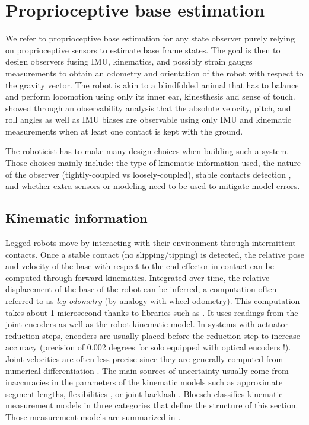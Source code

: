 \section{Proprioceptive base estimation}

We refer to proprioceptive base estimation for any state observer purely relying on proprioceptive sensors to estimate base frame states. 
The goal is then to design observers fusing IMU, kinematics, and possibly strain gauges measurements to obtain an odometry and orientation of 
the robot with respect to the gravity vector. The robot is akin to a blindfolded animal that has to balance and perform locomotion using 
only its inner ear, kinesthesis and sense of touch. \cite{bloesch2013state,rotella2014state} showed through an observability analysis 
that the absolute velocity, pitch, and roll angles as well as IMU biases are observable using only IMU and kinematic measurements when at 
least one contact is kept with the ground.

The roboticist has to make many design choices when building such a system. Those choices mainly include: the type of kinematic information used, 
the nature of the observer (tightly-coupled vs loosely-coupled), stable contacts detection , and whether extra sensors or modeling need 
to be used to mitigate model errors.
 

\subsection{Kinematic information}
Legged robots move by interacting with their environment through intermittent contacts.
Once a stable contact (no slipping/tipping) is detected, the relative pose and velocity of the base with respect to the end-effector in contact 
can be computed through forward kinematics. Integrated over time, the relative displacement of the base of the robot can be inferred, a computation 
often referred to as \textit{leg odometry} (by analogy with wheel odometry). This computation takes about 1 microsecond thanks to libraries such as \cite{carpentier2019pinocchio, hereid2017frost}. It uses
readings from the joint encoders as well as the robot kinematic model. In systems with actuator reduction steps, encoders are usually placed before the reduction step 
to increase accuracy (precision of 0.002 degrees for solo equipped with optical encoders \cite{grimminger2020open}!). Joint velocities are often less precise since they are generally computed from numerical differentiation \cite{rotella2016imu}. 
The main sources of uncertainty usually come from inaccuracies in the parameters of the kinematic models such as approximate segment lengths, flexibilities \cite{vigne2018estimation, villa2022addressing}, or 
joint backlash \cite{fallon2014drift, koolen2016design}. 
Bloesch \cite{bloesch2018technical} classifies kinematic measurement models in three categories that define the structure of this section. 
Those measurement models are summarized in .


